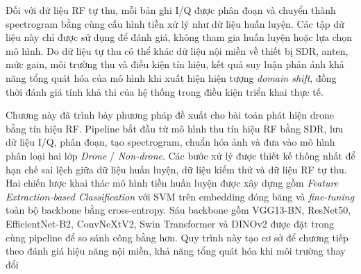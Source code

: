 \documentclass[../DoAn.tex]{subfiles}
\begin{document}
Đối với dữ liệu RF tự thu, mỗi bản ghi I/Q được phân đoạn và chuyển thành spectrogram bằng cùng cấu hình tiền xử lý như dữ liệu huấn luyện. Các tập dữ liệu này chỉ được sử dụng để đánh giá, không tham gia huấn luyện hoặc lựa chọn mô hình. Do dữ liệu tự thu có thể khác dữ liệu nội miền về thiết bị SDR, anten, mức gain, môi trường thu và điều kiện tín hiệu, kết quả suy luận phản ánh khả năng tổng quát hóa của mô hình khi xuất hiện hiện tượng \textit{domain shift}, đồng thời đánh giá tính khả thi của hệ thống trong điều kiện triển khai thực tế.


Chương này đã trình bày phương pháp đề xuất cho bài toán phát hiện drone bằng tín hiệu RF. Pipeline bắt đầu từ mô hình thu tín hiệu RF bằng SDR, lưu dữ liệu I/Q, phân đoạn, tạo spectrogram, chuẩn hóa ảnh và đưa vào mô hình phân loại hai lớp \textit{Drone} / \textit{Non-drone}. Các bước xử lý được thiết kế thống nhất để hạn chế sai lệch giữa dữ liệu huấn luyện, dữ liệu kiểm thử và dữ liệu RF tự thu. Hai chiến lược khai thác mô hình tiền huấn luyện được xây dựng gồm \textit{Feature Extraction-based Classification} với SVM trên embedding đóng băng và \textit{fine-tuning} toàn bộ backbone bằng cross-entropy. Sáu backbone gồm VGG13-BN, ResNet50, EfficientNet-B2, ConvNeXtV2, Swin Transformer và DINOv2 được đặt trong cùng pipeline để so sánh công bằng hơn. Quy trình này tạo cơ sở để chương tiếp theo đánh giá hiệu năng nội miền, khả năng tổng quát hóa khi môi trường thay đổi
\end{document}
